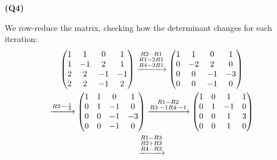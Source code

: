 \documentclass[12pt, a4paper]{article}
\begin{document}
\textbf{(Q4)}

We row-reduce the matrix, checking how the determinant changes
for each iteration:
\begin{gather*}
    \begin{pmatrix}
        1 &  1 & 0 & 1\\
        1 & -1 & 2 & 1\\
        2 & 2 & -1 & -1\\
        2 & 2 & -1 & 2\\
    \end{pmatrix} \xrightarrow{
        \begin{subarray}{c}
            R2 - R1\\
            R1 - 2R1\\
            R4 - 2R1
        \end{subarray}
    }
    \begin{pmatrix}
        1 &  1 & 0 & 1\\
        0 & -2 & 2 & 0\\
        0 & 0 & -1 & -3\\
        0 & 0 & -1 & 0\\
    \end{pmatrix} \\ \xrightarrow{R2 \cdot -\frac{1}{2}}
    \begin{pmatrix}
        1 &  1 & 0 & 1\\
        0 & 1 & -1 & 0\\
        0 & 0 & -1 & -3\\
        0 & 0 & -1 & 0\\
    \end{pmatrix} \xrightarrow{
        \begin{subarray}{c}
            R1 - R2\\
            R3 \cdot -1
            R4 \cdot -1
        \end{subarray}
    }
    \begin{pmatrix}
        1 &  0 & 1 & 1\\
        0 & 1 & -1 & 0\\
        0 & 0 &  1 & 3\\
        0 & 0 &  1 & 0\\
    \end{pmatrix} \\ \xrightarrow{
        \begin{subarray}{c}
            R1 - R3\\
            R2 + R3\\
            R4 - R3

\end{subarray}}
\end{gather*}
\end{document}
